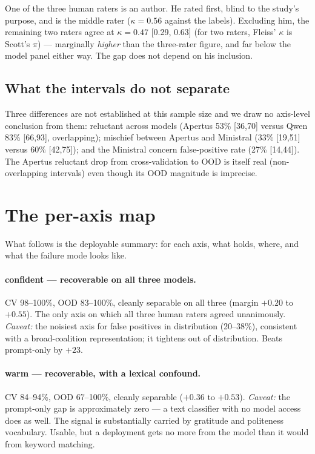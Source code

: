 \documentclass[11pt]{article}
\begin{document}
One of the three human raters is an author. He rated first, blind to the study's purpose, and is
the middle rater ($\kappa = 0.56$ against the labels). Excluding him, the remaining two raters
agree at $\kappa = 0.47$ [0.29, 0.63] (for two raters, Fleiss' $\kappa$ is Scott's $\pi$) ---
marginally \emph{higher} than the three-rater figure, and far below the model panel either way.
The gap does not depend on his inclusion.

\subsection{What the intervals do not separate}

Three differences are not established at this sample size and we draw no axis-level conclusion
from them: reluctant across models (Apertus 53\% [36,70] versus Qwen 83\% [66,93], overlapping);
mischief between Apertus and Ministral (33\% [19,51] versus 60\% [42,75]); and the Ministral
concern false-positive rate (27\% [14,44]). The Apertus reluctant drop from cross-validation to
OOD is itself real (non-overlapping intervals) even though its OOD magnitude is imprecise.

\section{The per-axis map}

What follows is the deployable summary: for each axis, what holds, where, and what the failure
mode looks like.

\paragraph{confident --- recoverable on all three models.}
CV 98--100\%, OOD 83--100\%, cleanly separable on all three (margin $+0.20$ to $+0.55$). The only
axis on which all three human raters agreed unanimously. \emph{Caveat:} the noisiest axis for
false positives in distribution (20--38\%), consistent with a broad-coalition representation; it
tightens out of distribution. Beats prompt-only by $+23$.

\paragraph{warm --- recoverable, with a lexical confound.}
CV 84--94\%, OOD 67--100\%, cleanly separable ($+0.36$ to $+0.53$). \emph{Caveat:} the prompt-only
gap is approximately zero --- a text classifier with no model access does as well. The signal is
substantially carried by gratitude and politeness vocabulary. Usable, but a deployment gets no
more from the model than it would from keyword matching.
\end{document}
